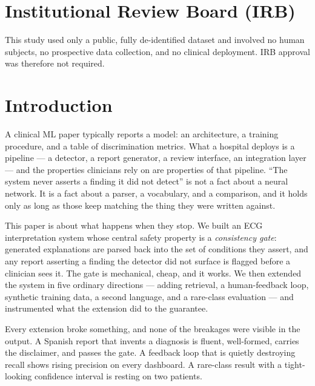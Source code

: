\documentclass[pmlr,twocolumn,10pt]{jmlr}
\begin{document}
\section*{Institutional Review Board (IRB)}
This study used only a public, fully de-identified dataset and involved no human subjects,
no prospective data collection, and no clinical deployment. IRB approval was therefore not
required.

\section{Introduction}

A clinical ML paper typically reports a model: an architecture, a training procedure, and a
table of discrimination metrics. What a hospital deploys is a pipeline --- a detector, a
report generator, a review interface, an integration layer --- and the properties clinicians
rely on are properties of that pipeline. ``The system never asserts a finding it did not
detect'' is not a fact about a neural network. It is a fact about a parser, a vocabulary,
and a comparison, and it holds only as long as those keep matching the thing they were
written against.

This paper is about what happens when they stop. We built an ECG interpretation system whose
central safety property is a \emph{consistency gate}: generated explanations are parsed back
into the set of conditions they assert, and any report asserting a finding the detector did
not surface is flagged before a clinician sees it. The gate is mechanical, cheap, and it
works. We then extended the system in five ordinary directions --- adding retrieval, a
human-feedback loop, synthetic training data, a second language, and a rare-class evaluation
--- and instrumented what the extension did to the guarantee.

Every extension broke something, and none of the breakages were visible in the output. A
Spanish report that invents a diagnosis is fluent, well-formed, carries the disclaimer, and
passes the gate. A feedback loop that is quietly destroying recall shows rising precision on
every dashboard. A rare-class result with a tight-looking confidence interval is resting on
two patients.
\end{document}
